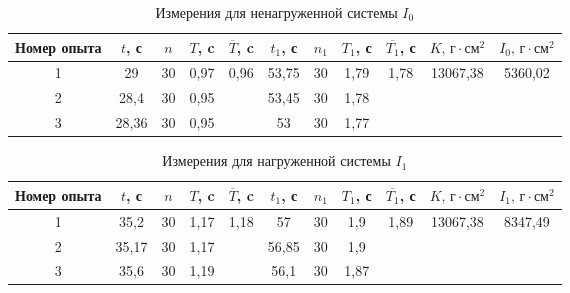 %
\begin{table}[ht]
    \centering

    \begin{tabular}{|c|c|c|c|c|c|c|c|c|c|c|}
        \hline
        Номер опыта & $t$, с & $n$ & $T$, c &  $\overline{T}$, c       & $t_1$, с & $n_1$ & $T_1$, с & $\overline{T_1}$, с        & $K \text{, г}\cdot\text{см}^2$ & $I_0\text{, г}\cdot\text{см}^2$ \\
        \hline
                  1 & 29     & 30  & 0,97   &\multirow{3}{*}{0,96}& 53,75    &  30   & 1,79     & \multirow{3}{*}{1,78} & \multirow{3}{*}{13067,38}        & \multirow{3}{*}{5360,02}          \\
        \cline{1-4} \cline{6-8}
                  2 & 28,4   & 30  & 0,95   &                     & 53,45    &  30   & 1,78     &                       &                                  &                                   \\
        \cline{1-4} \cline{6-8}
                  3 & 28,36  & 30  & 0,95   &                     & 53       &  30   & 1,77     &                       &                                  &                                   \\
        \hline
    \end{tabular}

    \caption{Измерения для ненагруженной системы $I_0$} \label{table-1}
\end{table}



\begin{table}[ht]
    \centering
    
    \begin{tabular}{|c|c|c|c|c|c|c|c|c|c|c|}
        \hline
        Номер опыта & $t$, с & $n$ & $T$, c &     $\overline{T}$, c      & $t_1$, с & $n_1$ & $T_1$, с & $\overline{T_1}$, с         & $K \text{, г}\cdot\text{см}^2$ & $I_1\text{, г}\cdot\text{см}^2$ \\
        \hline
                  1 &  35,2  & 30  &  1,17  & \multirow{3}{*}{1,18} &   57     &  30   &  1,9     & \multirow{3}{*}{1,89}  &     \multirow{3}{*}{13067,38 }   & \multirow{3}{*}{8347,49}          \\
        \cline{1-4} \cline{6-8}
                  2 &  35,17 & 30  &  1,17  &                       &   56,85  &  30   &  1,9     &                        &                                  &                                   \\
        \cline{1-4} \cline{6-8}
                  3 &  35,6  & 30  &  1,19  &                       &   56,1   &  30   &  1,87    &                        &                                  &                                   \\
        \hline
    \end{tabular}

    \caption{Измерения для нагруженной системы $I_1$} \label{table-2}
\end{table}

